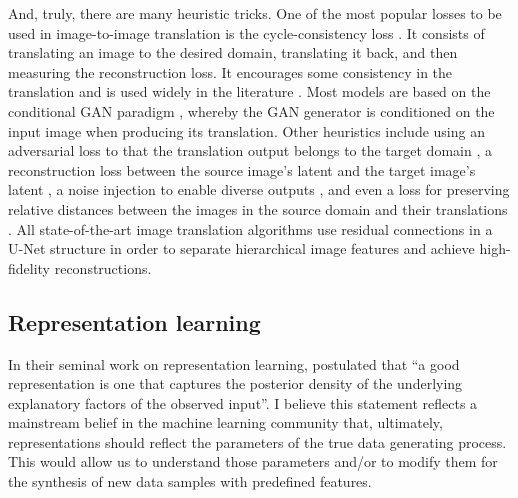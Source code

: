 \documentclass[../thesis.tex]{subfiles}
\begin{document}
And, truly, there are many heuristic tricks. One of the most popular losses to be used in image-to-image translation is the cycle-consistency loss \citep{zhu2017unpaired}. It consists of translating an image to the desired domain, translating it back, and then measuring the reconstruction loss. It encourages some consistency in the translation and is used widely in the literature \citep{liu2017unsupervised, royer2020xgan, lee2018diverse}. Most models are based on the conditional GAN paradigm \citep{mirza2014conditional}, whereby the GAN generator is conditioned on the input image when producing its translation. Other heuristics include using an adversarial loss to that the translation output belongs to the target domain \citep{taigman2016unsupervised, liu2017unsupervised, huang2018multimodal, choi2018stargan, royer2020xgan}, a reconstruction loss between the source image's latent and the target image's latent \citep{taigman2016unsupervised, royer2020xgan, liu2019few}, a noise injection to enable diverse outputs \citep{huang2018multimodal, lee2018diverse}, and even a loss for preserving relative distances between the images in the source domain and their translations \citep{benaim2018one}. All state-of-the-art image translation algorithms use residual connections in a U-Net structure \citep{ronneberger2015u} in order to separate hierarchical image features and achieve high-fidelity reconstructions.

\subsection{Representation learning}

In their seminal work on representation learning, \citet{bengioRepresentationLearningReview2014} postulated that ``a good representation is one that captures the posterior density of the underlying explanatory factors of the observed input''. I believe this statement reflects a mainstream belief in the machine learning community that, ultimately, representations should reflect the parameters of the true data generating process. This would allow us to understand those parameters and/or to modify them for the synthesis of new data samples with predefined features. 
\end{document}

